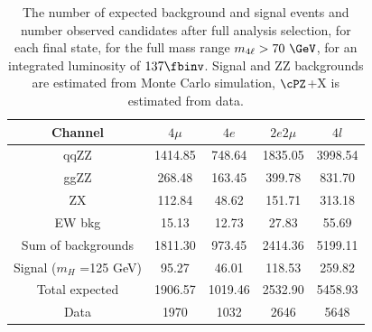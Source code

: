 \begin{table}[htb]
	\begin{center}
		\small
		\caption{The number of expected background and signal events 
			and number observed candidates after full analysis selection, for each final state, 
			for the full mass range $\mllll>70~\GeV$, for an integrated luminosity of $\usedLumiABC$.
			Signal and ZZ backgrounds are estimated from Monte Carlo simulation,
			$\cPZ$+X is estimated from data.
			\label{tab:EventYieldsFull}}
			
			\begin{tabular}{|c|c|c|c|c|}
	\hline
	\hline
	\textbf{Channel} & $4\mu$ & $4 e$ & $2e2\mu$ & $4l$ \\
	\hline
	qqZZ     &1414.85        &748.64         &1835.05        &3998.54        \\
	ggZZ     &268.48         &163.45         &399.78         &831.70         \\
	ZX       &112.84         &48.62  &151.71         &313.18         \\
	EW bkg   &15.13  &12.73  &27.83  &55.69  \\
	\hline
	Sum of backgrounds       &1811.30        &973.45         &2414.36        &5199.11        \\
	\hline
	Signal ($m_{H}$ =125 GeV)        &95.27  &46.01  &118.53         &259.82         \\
	\hline
	Total expected   &1906.57       &1019.46        &2532.90        &5458.93         \\
	\hline
	Data     &1970   &1032   &2646   &5648   \\
	\hline
	\hline
\end{tabular}



\end{center}
\end{table}
